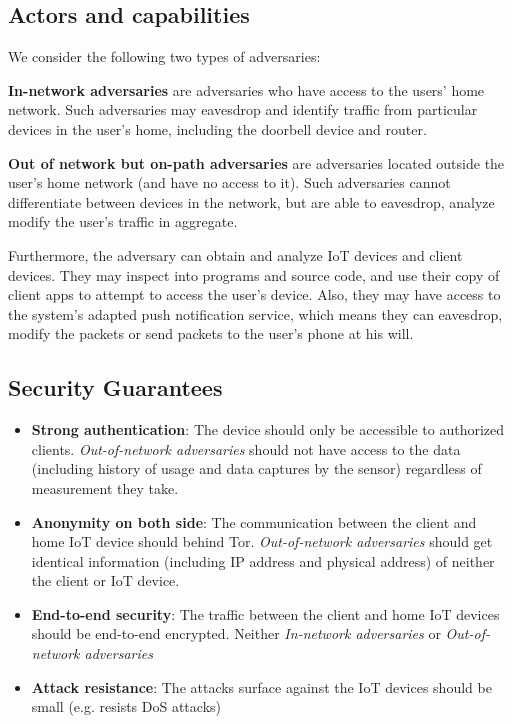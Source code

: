 \subsection{Actors and capabilities}
We consider the following two types of adversaries:

\textbf{In-network adversaries} are adversaries who have access to the users' home network. Such adversaries may eavesdrop and identify traffic from particular devices in the user's home, including the doorbell device and router.


\textbf{Out of network but on-path adversaries} are adversaries located outside the user's home network (and have no access to it). Such adversaries cannot differentiate between devices in the network, but are able to eavesdrop, analyze modify the user's traffic in aggregate.

Furthermore, the adversary can obtain and analyze IoT devices and client devices. They may inspect into programs and source code, and use their copy of client apps to attempt to access the user's device. Also, they may have access to the system's adapted push notification service, which means they can eavesdrop, modify the packets or send packets to the user's phone at his will.
\subsection{Security Guarantees}

\begin{itemize}
	\item \textbf{Strong authentication}: The device should only be accessible to authorized clients. \textit{Out-of-network adversaries} should not have access to the data (including history of usage and data captures by the sensor) regardless of measurement they take.
	\item \textbf{Anonymity on both side}: The communication between the client and home IoT device should behind Tor. \textit{Out-of-network adversaries} should  get identical information (including IP address and physical address) of neither the client or IoT device.
	\item \textbf{End-to-end security}: The traffic between the client and home IoT devices should be end-to-end encrypted. Neither \textit{In-network adversaries} or \textit{Out-of-network adversaries} 
	\item \textbf{Attack resistance}: The attacks surface against the IoT devices should be small (e.g. resists DoS attacks)
\end{itemize}


